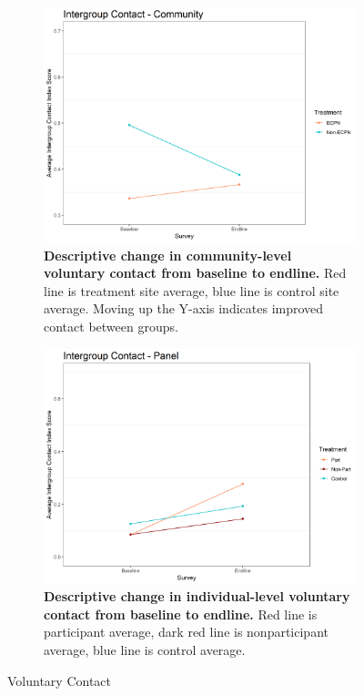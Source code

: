 \documentclass[11pt]{article}
\begin{document}
\begin{figure}[H]
    \begin{subfigure}[b]{.48\textwidth}
    \centering
        \includegraphics[width=\linewidth]{../../../figs/conComm_plot.png}
        \caption{\textbf{Descriptive change in community-level voluntary contact from baseline to endline.} Red line is treatment site average, blue line is control site average.  Moving up the Y-axis indicates improved contact between groups.}
        \label{fig:fig5}
    \end{subfigure}
    \hfill
    \begin{subfigure}[b]{.48\textwidth}
    \centering
        \includegraphics[width=\linewidth]{../../../figs/conPan_plot.png}
        \caption{\textbf{Descriptive change in individual-level voluntary contact from baseline to endline.} Red line is participant average, dark red line is nonparticipant average, blue line is control average.}
        \label{fig:fig6}
    \end{subfigure}
    \caption{Voluntary Contact}
\end{figure}
\end{document}

